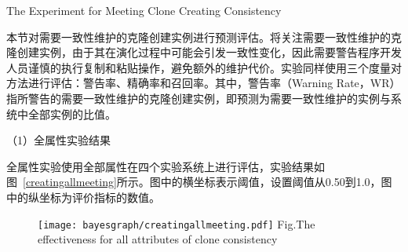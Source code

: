 
{The Experiment for Meeting Clone Creating Consistency}

本节对需要一致性维护的克隆创建实例进行预测评估。将关注需要一致性维护的克隆创建实例，由于其在演化过程中可能会引发一致性变化，因此需要警告程序开发人员谨慎的执行复制和粘贴操作，避免额外的维护代价。实验同样使用三个度量对方法进行评估：警告率、精确率和召回率。其中，警告率（Warning Rate，WR）指所警告的需要一致性维护的克隆创建实例，即预测为需要一致性维护的实例与系统中全部实例的比值。


（1）全属性实验结果

全属性实验使用全部属性在四个实验系统上进行评估，实验结果如图~\ref{creatingallmeeting}所示。图中的横坐标表示阈值，设置阈值从0.50到1.0，图中的纵坐标为评价指标的数值。

\begin{figure}[h]
\centering
\texttt{[image: bayesgraph/creatingallmeeting.pdf]}
{Fig.$\!$}{The effectiveness for all attributes of clone consistency}
\vspace{-1em}
\end{figure}

